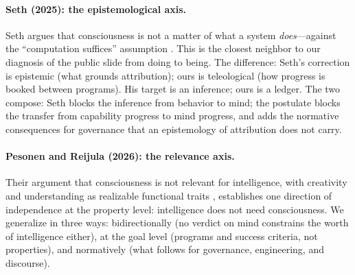 \documentclass[10pt]{article}
\begin{document}
\paragraph{Seth (2025): the epistemological axis.} Seth argues that consciousness is not a matter of what a system \emph{does}---against the ``computation suffices'' assumption \cite{seth2025conscious}. This is the closest neighbor to our diagnosis of the public slide from doing to being. The difference: Seth's correction is epistemic (what grounds attribution); ours is teleological (how progress is booked between programs). His target is an inference; ours is a ledger. The two compose: Seth blocks the inference from behavior to mind; the postulate blocks the transfer from capability progress to mind progress, and adds the normative consequences for governance that an epistemology of attribution does not carry.

\paragraph{Pesonen and Reijula (2026): the relevance axis.} Their argument that consciousness is not relevant for intelligence, with creativity and understanding as realizable functional traits \cite{pesonen2026notobstacles}, establishes one direction of independence at the property level: intelligence does not need consciousness. We generalize in three ways: bidirectionally (no verdict on mind constrains the worth of intelligence either), at the goal level (programs and success criteria, not properties), and normatively (what follows for governance, engineering, and discourse).
\end{document}
